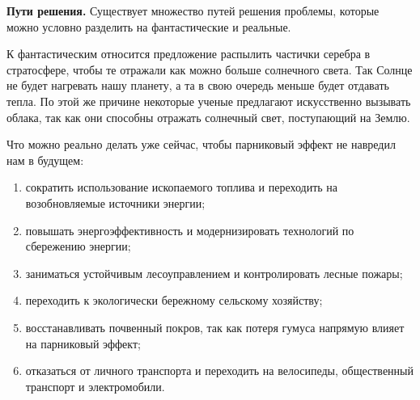 \textbf{Пути решения.}
Существует множество путей решения проблемы, которые можно условно разделить на фантастические и реальные.

К фантастическим относится предложение распылить частички серебра в стратосфере, чтобы те отражали как можно больше солнечного света. Так Солнце не будет нагревать нашу планету, а та в свою очередь меньше будет отдавать тепла. По этой же причине некоторые ученые предлагают искусственно вызывать облака, так как они способны отражать солнечный свет, поступающий на Землю.

Что можно реально делать уже сейчас, чтобы парниковый эффект не навредил нам в будущем:
\begin{enumerate}
    \item сократить использование ископаемого топлива и переходить на возобновляемые источники энергии;
    \item повышать энергоэффективность и модернизировать технологий по сбережению энергии;
    \item заниматься устойчивым лесоуправлением и контролировать лесные пожары;
    \item переходить к экологически бережному сельскому хозяйству;
    \item восстанавливать почвенный покров, так как потеря гумуса напрямую влияет на парниковый эффект;
    \item отказаться от личного транспорта и переходить на велосипеды, общественный транспорт и электромобили.
\end{enumerate}
